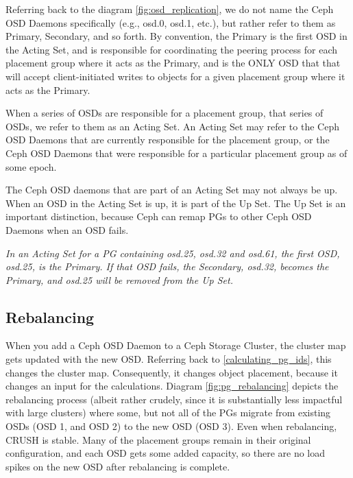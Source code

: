 \documentclass[12pt,a4paper]{report}
\begin{document}
Referring back to the diagram \ref{fig:osd_replication}, we do not
name the Ceph OSD Daemons specifically (e.g., osd.0, osd.1, etc.), but rather
refer to them as Primary, Secondary, and so forth. By convention, the Primary
is the first OSD in the Acting Set, and is responsible for coordinating the
peering process for each placement group where it acts as the Primary, and is
the ONLY OSD that that will accept client-initiated writes to objects for a
given placement group where it acts as the Primary.

When a series of OSDs are responsible for a placement group, that series of
OSDs, we refer to them as an Acting Set. An Acting Set may refer to the Ceph
OSD Daemons that are currently responsible for the placement group, or the Ceph
OSD Daemons that were responsible for a particular placement group as of some
epoch.

The Ceph OSD daemons that are part of an Acting Set may not always be up. When
an OSD in the Acting Set is up, it is part of the Up Set. The Up Set is an
important distinction, because Ceph can remap PGs to other Ceph OSD Daemons
when an OSD fails.

\emph{In an Acting Set for a PG containing osd.25, osd.32 and osd.61, the first
OSD, osd.25, is the Primary. If that OSD fails, the Secondary, osd.32,
becomes the Primary, and osd.25 will be removed from the Up Set.}

\subsection{Rebalancing}
When you add a Ceph OSD Daemon to a Ceph Storage Cluster, the cluster map gets
updated with the new OSD. Referring back to \ref{calculating_pg_ids}, this changes
the cluster map. Consequently, it changes object placement, because it changes
an input for the calculations. Diagram \ref{fig:pg_rebalancing} depicts the rebalancing
process (albeit rather crudely, since it is substantially less impactful with
large clusters) where some, but not all of the PGs migrate from existing OSDs
(OSD 1, and OSD 2) to the new OSD (OSD 3). Even when rebalancing, CRUSH is
stable. Many of the placement groups remain in their original configuration,
and each OSD gets some added capacity, so there are no load spikes on the new
OSD after rebalancing is complete.
\end{document}
